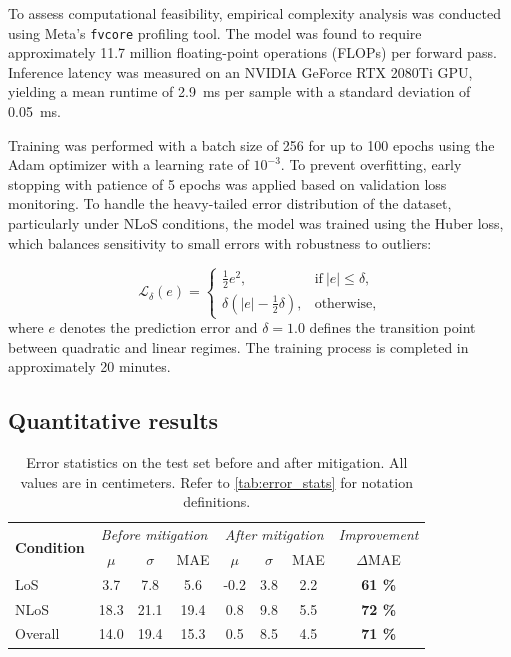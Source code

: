 To assess computational feasibility, empirical complexity analysis was conducted using Meta's \texttt{fvcore} profiling tool. The model was found to require approximately 11.7 million floating-point operations (FLOPs) per forward pass. Inference latency was measured on an NVIDIA GeForce RTX 2080Ti GPU, yielding a mean runtime of \SI{2.9}{\milli\second} per sample with a standard deviation of \SI{0.05}{\milli\second}.

Training was performed with a batch size of 256 for up to 100 epochs using the Adam optimizer with a learning rate of $10^{-3}$. To prevent overfitting, early stopping with patience of 5 epochs was applied based on validation loss monitoring. To handle the heavy-tailed error distribution of the dataset, particularly under NLoS conditions, the model was trained using the Huber loss, which balances sensitivity to small errors with robustness to outliers:

\begin{equation} 
\mathcal{L}_{\delta}(e) = 
\begin{cases} 
\frac{1}{2}e^2, & \text{if}\ |e| \leq \delta,\\
\delta \left(|e| - \frac{1}{2}\delta\right), & \text{otherwise}, 
\end{cases} 
\end{equation}
where $e$ denotes the prediction error and $\delta = 1.0$ defines the transition point between quadratic and linear regimes. The training process is completed in approximately 20 minutes.

\subsection{Quantitative results}

\begin{table}[tbh] 
\centering 
\caption[Error statistics before and after mitigation.]{Error statistics on the test set before and after mitigation. All values are in centimeters. Refer to \autoref{tab:error_stats} for notation definitions.} 
\label{tab:test_results} 
\begin{tabular}{lccc|ccc|c} 
\toprule 
\multirow{2}{*}{\textbf{Condition}} 
& \multicolumn{3}{c|}{\textit{Before mitigation}} 
& \multicolumn{3}{c|}{\textit{After mitigation}} 
& \textit{Improvement} \\
& $\mu$ & $\sigma$ & MAE & $\mu$ & $\sigma$ & MAE & $\Delta$MAE \\
\midrule 
LoS     & 3.7  & 7.8  & 5.6  & -0.2 & 3.8 & 2.2 & \textbf{61 \%} \\
NLoS    & 18.3 & 21.1 & 19.4 & 0.8  & 9.8 & 5.5 & \textbf{72 \%} \\
Overall & 14.0 & 19.4 & 15.3 & 0.5  & 8.5 & 4.5 & \textbf{71 \%} \\
\bottomrule 
\end{tabular} 
\end{table}

